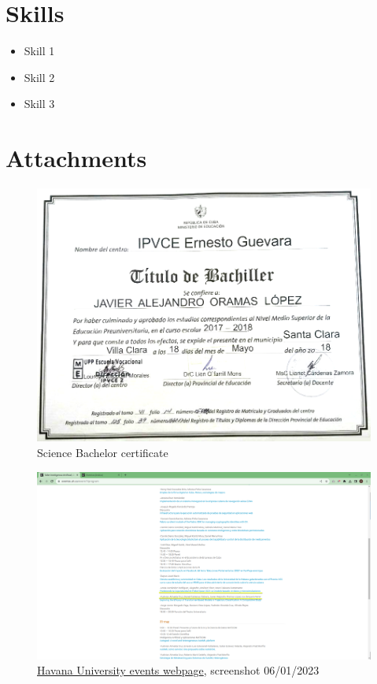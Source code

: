 \documentclass[a4paper,12pt]{article}
\begin{document}
\section*{Skills}
\begin{itemize}
    \item Skill 1
    \item Skill 2
    \item Skill 3
\end{itemize}

\newpage
\section*{Attachments}
\begin{figure}[h]
    \includegraphics[width=\textwidth]{images/bachelor.png}
    \caption{Science Bachelor certificate}
    \label{sec:bachelor}
\end{figure}

\begin{figure}[h]
    \includegraphics[width=\textwidth]{images/ai_workshop.png}
    \caption{\href{https://eventos.uh.cu/event/7/program}{Havana University events webpage}, screenshot 06/01/2023}
    \label{sec:workshop}
\end{figure}
\end{document}
